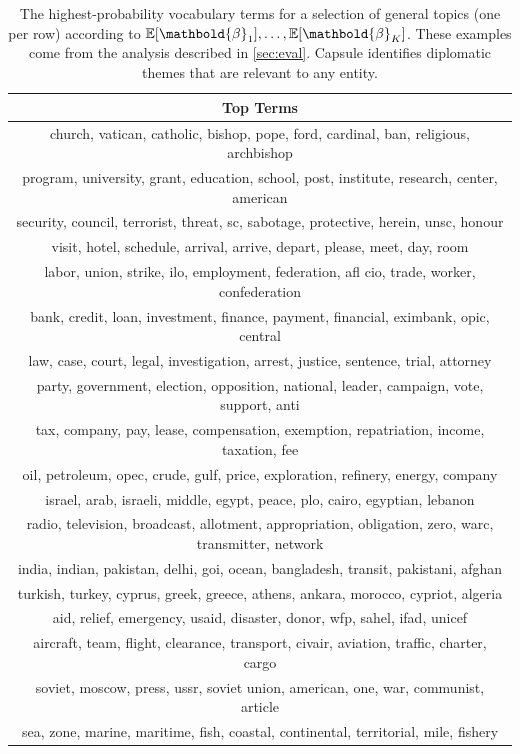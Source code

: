 \begin{table}
\centering
\small
\begin{tabular}{c}
\toprule
\textbf{Top Terms} \\
\midrule
church, vatican, catholic, bishop, pope, ford, cardinal, ban, religious, archbishop \\
program, university, grant, education, school, post, institute, research, center, american \\
security, council, terrorist, threat, sc, sabotage, protective, herein, unsc, honour \\
visit, hotel, schedule, arrival, arrive, depart, please, meet, day, room \\
labor, union, strike, ilo, employment, federation, afl cio, trade, worker, confederation \\
bank, credit, loan, investment, finance, payment, financial, eximbank, opic, central \\
law, case, court, legal, investigation, arrest, justice, sentence, trial, attorney \\
party, government, election, opposition, national, leader, campaign, vote, support, anti \\
tax, company, pay, lease, compensation, exemption, repatriation, income, taxation, fee \\
oil, petroleum, opec, crude, gulf, price, exploration, refinery, energy, company \\
israel, arab, israeli, middle, egypt, peace, plo, cairo, egyptian, lebanon \\
radio, television, broadcast, allotment, appropriation, obligation, zero, warc, transmitter, network \\
india, indian, pakistan, delhi, goi, ocean, bangladesh, transit, pakistani, afghan \\
turkish, turkey, cyprus, greek, greece, athens, ankara, morocco, cypriot, algeria \\
aid, relief, emergency, usaid, disaster, donor, wfp, sahel, ifad, unicef \\
aircraft, team, flight, clearance, transport, civair, aviation, traffic, charter, cargo \\
soviet, moscow, press, ussr, soviet union, american, one, war, communist, article \\
sea, zone, marine, maritime, fish, coastal, continental, territorial, mile, fishery \\
\bottomrule
\end{tabular}
\caption{The highest-probability vocabulary terms
for a selection of
general topics (one per row) according to
$\E[\mathbold{\beta}_1], \ldots, \E[\mathbold{\beta}_K]$. These
examples come from the analysis described in \cref{sec:eval}. Capsule identifies diplomatic
themes that are relevant to any entity.}
\label{tab:topics}
\end{table}

